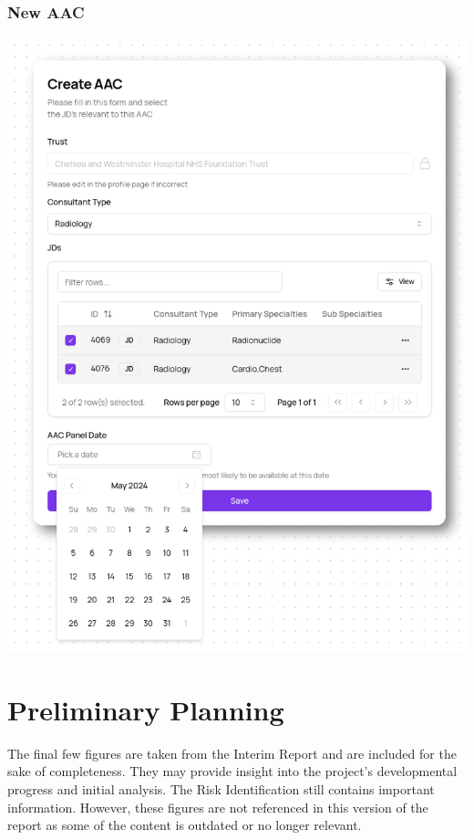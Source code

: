 \begin{appendices}
\subsection{New AAC} \label{app:NewAAC}
\includegraphics[width=\textwidth]{images/aac-form.png}

\chapter{Preliminary Planning}
The final few figures are taken from the Interim Report and are included for the sake of completeness. They may provide insight into the project's developmental progress and initial analysis. The Risk Identification still contains important information. However, these figures are not referenced in this version of the report as some of the content is outdated or no longer relevant.
\vspace{-10pt}

\end{appendices}
